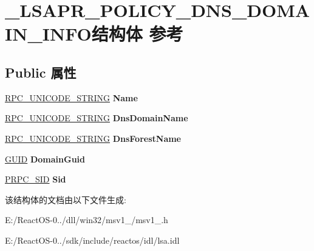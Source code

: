 \hypertarget{struct___l_s_a_p_r___p_o_l_i_c_y___d_n_s___d_o_m_a_i_n___i_n_f_o}{}\section{\+\_\+\+L\+S\+A\+P\+R\+\_\+\+P\+O\+L\+I\+C\+Y\+\_\+\+D\+N\+S\+\_\+\+D\+O\+M\+A\+I\+N\+\_\+\+I\+N\+F\+O结构体 参考}
\label{struct___l_s_a_p_r___p_o_l_i_c_y___d_n_s___d_o_m_a_i_n___i_n_f_o}
\subsection*{Public 属性}
\begin{DoxyCompactItemize}
\item 
\mbox{\label{struct___l_s_a_p_r___p_o_l_i_c_y___d_n_s___d_o_m_a_i_n___i_n_f_o_abac961449d30d40a2728f19d885be63f}} 
\hyperlink{struct___r_p_c___u_n_i_c_o_d_e___s_t_r_i_n_g}{R\+P\+C\+\_\+\+U\+N\+I\+C\+O\+D\+E\+\_\+\+S\+T\+R\+I\+NG} {\bfseries Name}
\item 
\mbox{\label{struct___l_s_a_p_r___p_o_l_i_c_y___d_n_s___d_o_m_a_i_n___i_n_f_o_a220563a3b17745c93658d678ed32b742}} 
\hyperlink{struct___r_p_c___u_n_i_c_o_d_e___s_t_r_i_n_g}{R\+P\+C\+\_\+\+U\+N\+I\+C\+O\+D\+E\+\_\+\+S\+T\+R\+I\+NG} {\bfseries Dns\+Domain\+Name}
\item 
\mbox{\label{struct___l_s_a_p_r___p_o_l_i_c_y___d_n_s___d_o_m_a_i_n___i_n_f_o_a6fd50a8c5c64498a7c05c5cbd8c95cd2}} 
\hyperlink{struct___r_p_c___u_n_i_c_o_d_e___s_t_r_i_n_g}{R\+P\+C\+\_\+\+U\+N\+I\+C\+O\+D\+E\+\_\+\+S\+T\+R\+I\+NG} {\bfseries Dns\+Forest\+Name}
\item 
\mbox{\label{struct___l_s_a_p_r___p_o_l_i_c_y___d_n_s___d_o_m_a_i_n___i_n_f_o_a9cedec4d7580b12a7691a1bf1a463037}} 
\hyperlink{interface_g_u_i_d}{G\+U\+ID} {\bfseries Domain\+Guid}
\item 
\mbox{\label{struct___l_s_a_p_r___p_o_l_i_c_y___d_n_s___d_o_m_a_i_n___i_n_f_o_a050bf002bf0c42685f803ad6ab1c05e1}} 
\hyperlink{struct___r_p_c___s_i_d}{P\+R\+P\+C\+\_\+\+S\+ID} {\bfseries Sid}
\end{DoxyCompactItemize}


该结构体的文档由以下文件生成\+:\begin{DoxyCompactItemize}
\item 
E\+:/\+React\+O\+S-\/0../dll/win32/msv1\+\_/msv1\+\_.\+h\item 
E\+:/\+React\+O\+S-\/0../sdk/include/reactos/idl/lsa.\+idl\end{DoxyCompactItemize}
